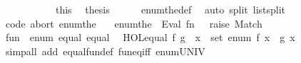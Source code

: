 \begin{isabellebody}
\ \ \ \ \isamarkupfalse%
\isanewline
\ \ \isacommand{{\isacharbraceright}{\kern0pt}}\isamarkupfalse%
\isanewline
\ \ \isamarkupfalse%
\ this\ \isamarkupfalse%
\ {\isacharquery}{\kern0pt}thesis\isanewline
\ \ \ \ \isamarkupfalse%
\ enum{\isacharunderscore}{\kern0pt}the{\isacharunderscore}{\kern0pt}def\ \isamarkupfalse%
\ {\isacharparenleft}{\kern0pt}auto\ split{\isacharcolon}{\kern0pt}\ list{\isachardot}{\kern0pt}split{\isacharparenright}{\kern0pt}\isanewline
{}\isamarkupfalse%
%
\endisatagproof
{\isafoldproof}%
%
\isadelimproof
\isanewline
%
\endisadelimproof
\isanewline
{}\isamarkupfalse%
\ {\isacharbrackleft}{\kern0pt}{\isacharbrackleft}{\kern0pt}code\ abort{\isacharcolon}{\kern0pt}\ enum{\isacharunderscore}{\kern0pt}the{\isacharbrackright}{\kern0pt}{\isacharbrackright}{\kern0pt}\isanewline
\isanewline
{}\isamarkupfalse%
\isanewline
\ \ \ enum{\isacharunderscore}{\kern0pt}the\ {\isasymrightharpoonup}\ {\isacharparenleft}{\kern0pt}Eval{\isacharparenright}{\kern0pt}\ {\isachardoublequoteopen}{\isacharparenleft}{\kern0pt}fn\ {\isacharprime}{\kern0pt}{\isacharunderscore}{\kern0pt}\ {\isacharequal}{\kern0pt}{\isachargreater}{\kern0pt}\ raise\ Match{\isacharparenright}{\kern0pt}{\isachardoublequoteclose}%
\isadelimdocument
%
\endisadelimdocument
%
\isatagdocument
%
\isamarkuptrue%
%
\endisatagdocument
{\isafolddocument}%
%
\isadelimdocument
%
\endisadelimdocument
{}\isamarkupfalse%
\ {\isachardoublequoteopen}fun{\isachardoublequoteclose}\ {\isacharcolon}{\kern0pt}{\isacharcolon}{\kern0pt}\ {\isacharparenleft}{\kern0pt}enum{\isacharcomma}{\kern0pt}\ equal{\isacharparenright}{\kern0pt}\ equal\isanewline
{}\isanewline
\isanewline
{}\isamarkupfalse%
\isanewline
\ \ {\isachardoublequoteopen}HOL{\isachardot}{\kern0pt}equal\ f\ g\ {\isasymlongleftrightarrow}\ {\isacharparenleft}{\kern0pt}{\isasymforall}x\ {\isasymin}\ set\ enum{\isachardot}{\kern0pt}\ f\ x\ {\isacharequal}{\kern0pt}\ g\ x{\isacharparenright}{\kern0pt}{\isachardoublequoteclose}\isanewline
\isanewline
{}\isamarkupfalse%
%
\isadelimproof
\ %
\endisadelimproof
%
\isatagproof
{}\isamarkupfalse%
\isanewline
{}\isamarkupfalse%
\ {\isacharparenleft}{\kern0pt}simp{\isacharunderscore}{\kern0pt}all\ add{\isacharcolon}{\kern0pt}\ equal{\isacharunderscore}{\kern0pt}fun{\isacharunderscore}{\kern0pt}def\ fun{\isacharunderscore}{\kern0pt}eq{\isacharunderscore}{\kern0pt}iff\ enum{\isacharunderscore}{\kern0pt}UNIV{\isacharparenright}{\kern0pt}%

\end{isabellebody}
